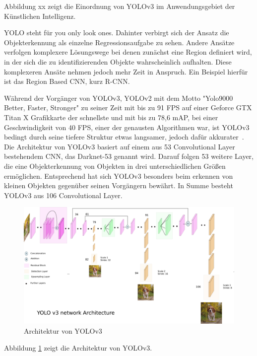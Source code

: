 Abbildung xx zeigt die Einordnung von YOLOv3 im Anwendungsgebiet der Künstlichen Intelligenz. 


YOLO steht für you only look ones. Dahinter verbirgt sich der Ansatz die Objekterkennung als einzelne Regressionsaufgabe zu sehen. Andere Ansätze verfolgen komplexere Lösungswege bei denen zunächst eine Region definiert wird, in der sich die zu identifizierenden Objekte wahrscheinlich aufhalten. Diese komplexeren Ansäte nehmen jedoch mehr Zeit in Anspruch. Ein Beispiel hierfür ist das Region Based CNN, kurz R-CNN. 

Während der Vorgänger von YOLOv3, YOLOv2 mit dem Motto "Yolo9000 Better, Faster, Stronger" zu seiner Zeit mit bis zu 91 FPS auf einer Geforce GTX Titan X Grafikkarte der schnellste und mit bis zu 78,6 mAP, bei einer Geschwindigkeit von 40 FPS, einer der genausten Algorithmen war, ist YOLOv3 bedingt durch seine tiefere Struktur etwas langsamer, jedoch dafür akkurater~\cite{redmon2017yolo9000}. Die Architektur von YOLOv3 basiert auf einem aus 53 Convolutional Layer bestehendem CNN, das Darknet-53 genannt wird. 
Darauf folgen 53 weitere Layer, die eine Objekterkennung von Objekten in drei unterschiedlichen Größen ermöglichen. Entsprechend hat sich YOLOv3 besonders beim erkennen von kleinen Objekten gegenüber seinen Vorgängern bewährt. In Summe besteht YOLOv3 aus 106 Convolutional Layer.

\begin{figure}[h]
	
	\begin{center}
		
		\includegraphics[width=16cm]{images/Yolov3 archtecture.png}
		
		\caption{Architektur von YOLOv3}
		
		\label{yolo_arch}
		
	\end{center}
	
	
\end{figure}

Abbildung \ref{yolo_arch} zeigt die Architektur von YOLOv3.








